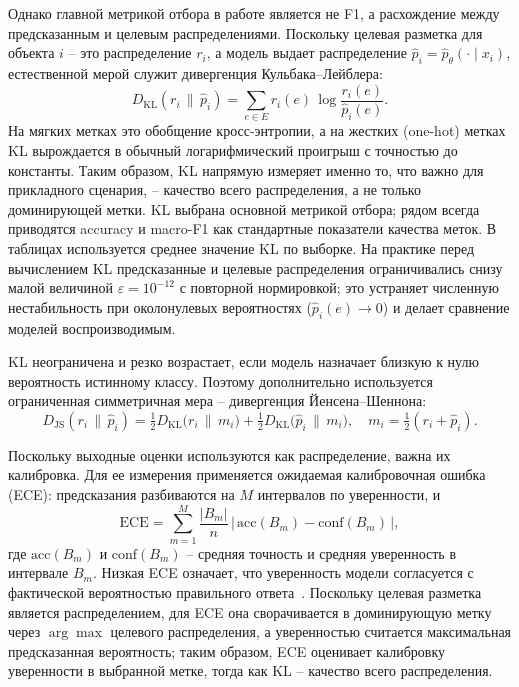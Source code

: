 \documentclass[12pt,a4paper]{report}
\begin{document}
Однако главной метрикой отбора в работе является не F1, а расхождение между предсказанным и целевым распределениями. Поскольку целевая разметка для объекта \(i\) -- это распределение \(r_i\), а модель выдает распределение \(\hat p_i=\hat p_\theta(\cdot\mid x_i)\), естественной мерой служит дивергенция Кульбака--Лейблера:
\begin{equation}
  D_{\mathrm{KL}}(r_i \,\|\, \hat p_i) = \sum_{e\in E} r_i(e)\,\log\frac{r_i(e)}{\hat p_i(e)}.
  \label{eq:kl}
\end{equation}
На мягких метках это обобщение кросс-энтропии, а на жестких (one-hot) метках KL вырождается в обычный логарифмический проигрыш с точностью до константы. Таким образом, KL напрямую измеряет именно то, что важно для прикладного сценария, -- качество всего распределения, а не только доминирующей метки. KL выбрана основной метрикой отбора; рядом всегда приводятся accuracy и macro-F1 как стандартные показатели качества меток. В таблицах используется среднее значение KL по выборке. На практике перед вычислением KL предсказанные и целевые распределения ограничивались снизу малой величиной \(\varepsilon=10^{-12}\) с повторной нормировкой; это устраняет численную нестабильность при околонулевых вероятностях (\(\hat p_i(e)\to 0\)) и делает сравнение моделей воспроизводимым.

KL неограничена и резко возрастает, если модель назначает близкую к нулю вероятность истинному классу. Поэтому дополнительно используется ограниченная симметричная мера -- дивергенция Йенсена--Шеннона:
\[
  D_{\mathrm{JS}}(r_i\,\|\,\hat p_i) = \tfrac{1}{2} D_{\mathrm{KL}}\!\big(r_i\,\|\,m_i\big) + \tfrac{1}{2} D_{\mathrm{KL}}\!\big(\hat p_i\,\|\,m_i\big), \quad m_i = \tfrac{1}{2}(r_i+\hat p_i).
\]

Поскольку выходные оценки используются как распределение, важна их калибровка. Для ее измерения применяется ожидаемая калибровочная ошибка (ECE): предсказания разбиваются на \(M\) интервалов по уверенности, и
\begin{equation}
  \mathrm{ECE} = \sum_{m=1}^{M} \frac{|B_m|}{n}\,\big|\,\mathrm{acc}(B_m) - \mathrm{conf}(B_m)\,\big|,
  \label{eq:ece}
\end{equation}
где \(\mathrm{acc}(B_m)\) и \(\mathrm{conf}(B_m)\) -- средняя точность и средняя уверенность в интервале \(B_m\). Низкая ECE означает, что уверенность модели согласуется с фактической вероятностью правильного ответа~\cite{guo2017calibration}. Поскольку целевая разметка является распределением, для ECE она сворачивается в доминирующую метку через \(\arg\max\) целевого распределения, а уверенностью считается максимальная предсказанная вероятность; таким образом, ECE оценивает калибровку уверенности в выбранной метке, тогда как KL -- качество всего распределения.
\end{document}
